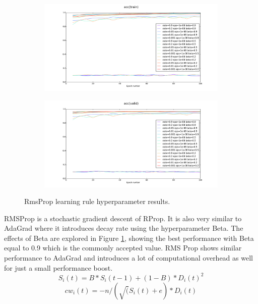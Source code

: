 \documentclass[12pt]{article}
\begin{document}
\begin{figure}[h]
\centering
\begin{subfigure}{.5\textwidth}
  \centering
  \includegraphics[width=9.1cm]{Task3/figures/Rms_acc(train).pdf}
\end{subfigure}%
\begin{subfigure}{.5\textwidth}
  \centering
  \includegraphics[width=9.1cm]{Task3/figures/Rms_acc(valid).pdf}
\end{subfigure}%
  \caption{RmsProp learning rule hyperparameter results.}
  \label{fig:rms}
\end{figure}

RMSProp is a stochastic gradient descent of RProp. It is also very similar to AdaGrad where it introduces decay rate using the hyperparameter Beta. The effects of Beta are explored in Figure \ref{fig:rms}, showing the best performance with Beta equal to 0.9 which is the commonly accepted value. RMS Prop shows similar performance to AdaGrad and introduces a lot of computational overhead as well for just a small performance boost.
\[ S_i(t) =B*S_i(t-1) + (1-B)*D_i(t)^2\] 
\[ cw_i(t) = -n/(\surd(S_i(t)+e)*D_i(t) \] 
\end{document}
